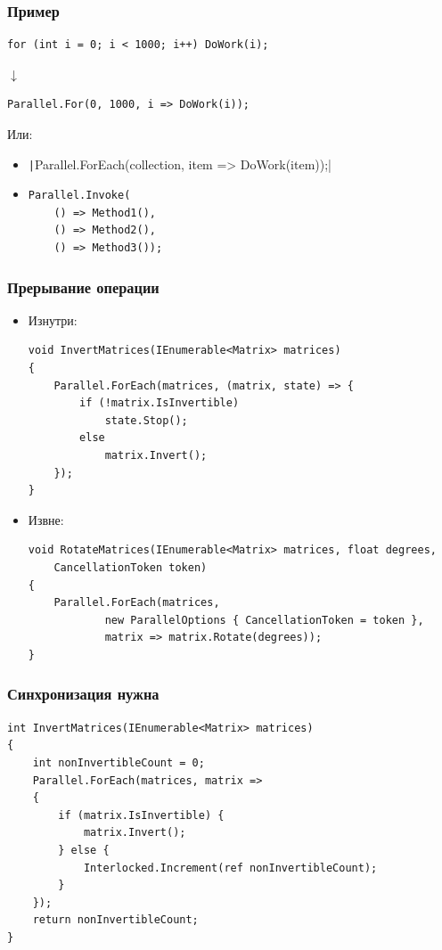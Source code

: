 \documentclass[xetex,mathserif,serif]{beamer}
\newcommand{\DownArrow} {
	\hspace{2cm}\begin{LARGE}$\downarrow$\end{LARGE}
}
\begin{document}
	\begin{frame}[fragile]
		\frametitle{Пример}
		\begin{verbatim}
for (int i = 0; i < 1000; i++) DoWork(i);
		\end{verbatim}
		\DownArrow
		\begin{verbatim}
Parallel.For(0, 1000, i => DoWork(i));
		\end{verbatim}

		Или:
		\begin{itemize}
			\item \texttt|Parallel.ForEach(collection, item => DoWork(item));|
			\item 
				\begin{verbatim}
Parallel.Invoke(
    () => Method1(),
    () => Method2(),
    () => Method3());
				\end{verbatim}
		\end{itemize}
	\end{frame}

	\begin{frame}[fragile]
		\frametitle{Прерывание операции}
		\begin{itemize}
			\item Изнутри:
			\begin{footnotesize}
				\begin{verbatim}
void InvertMatrices(IEnumerable<Matrix> matrices)
{
    Parallel.ForEach(matrices, (matrix, state) => {
        if (!matrix.IsInvertible)
            state.Stop();
        else
            matrix.Invert();
    });
}
				\end{verbatim}
			\end{footnotesize}

			\item Извне:
			\begin{footnotesize}
				\begin{verbatim}
void RotateMatrices(IEnumerable<Matrix> matrices, float degrees,
    CancellationToken token)
{
    Parallel.ForEach(matrices,
            new ParallelOptions { CancellationToken = token },
            matrix => matrix.Rotate(degrees));
}
				\end{verbatim}
			\end{footnotesize}
		\end{itemize}
	\end{frame}

	\begin{frame}[fragile]
		\frametitle{Синхронизация нужна}
		\begin{footnotesize}
			\begin{verbatim}
int InvertMatrices(IEnumerable<Matrix> matrices)
{
    int nonInvertibleCount = 0;
    Parallel.ForEach(matrices, matrix =>
    {
        if (matrix.IsInvertible) {
            matrix.Invert();
        } else {
            Interlocked.Increment(ref nonInvertibleCount);
        }
    });
    return nonInvertibleCount;
}
			\end{verbatim}
		\end{footnotesize}
	\end{frame}
\end{document}
